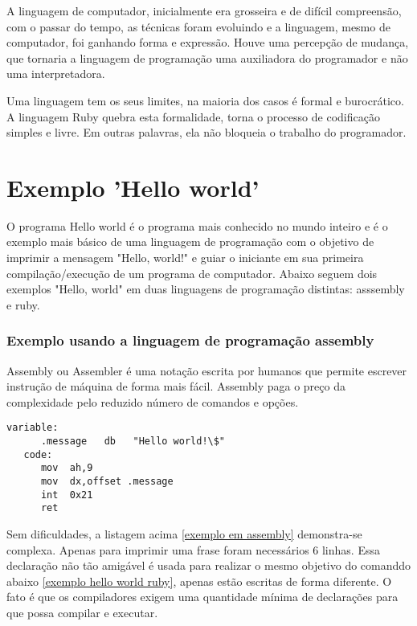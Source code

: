 \documentclass[espaco=simples,appendix=Name]{abnt}
\begin{document}
A linguagem de computador, inicialmente era grosseira e de difícil compreensão, com o passar do tempo, as técnicas foram evoluindo e a linguagem, mesmo de computador, foi ganhando forma e expressão. Houve uma percepção de mudança, que tornaria a linguagem de programação uma auxiliadora do programador e não uma interpretadora.

Uma linguagem tem os seus limites, na maioria dos casos é formal e burocrático. A linguagem Ruby quebra esta formalidade, torna o processo de codificação simples e livre. Em outras palavras, ela não bloqueia o trabalho do programador.

\section{Exemplo 'Hello world'}

   O programa Hello world é o programa mais conhecido no mundo inteiro e é o exemplo mais básico de uma linguagem de programação com o objetivo de imprimir a mensagem "Hello, world!" e guiar o iniciante em sua primeira compilação/execução de um programa de computador. Abaixo seguem dois exemplos "Hello, world" em duas linguagens de programação distintas: asssembly e ruby.


\subsubsection {Exemplo usando a linguagem de programação assembly}

Assembly ou Assembler é uma notação escrita por humanos que permite escrever instrução de máquina de forma mais fácil. Assembly paga o preço da complexidade pelo reduzido número de comandos e opções.

\begin{lstlisting}[label=exemplo em assembly,caption=Exemplo em assembly]
   variable:
      .message   db   "Hello world!\$"
   code:
      mov  ah,9
      mov  dx,offset .message
      int  0x21
      ret
\end{lstlisting}

Sem dificuldades, a listagem acima \ref{exemplo em assembly} demonstra-se complexa. Apenas para imprimir uma frase foram necessários 6 linhas. Essa declaração não tão amigável é usada para realizar o mesmo objetivo do comanddo abaixo \ref{exemplo hello world ruby}, apenas estão escritas de forma diferente. O fato é que os compiladores exigem uma quantidade mínima de declarações para que possa compilar e executar.
\end{document}
